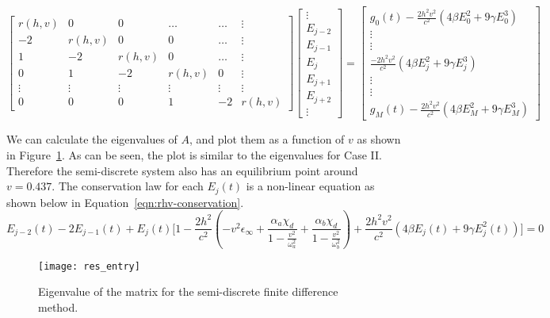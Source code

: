 \documentclass{article}[12pt]
\theoremstyle{plain}
\begin{document}
\[
\begin{bmatrix}
r(h,v) & 0 & 0 & \ldots & \ldots & \vdots \\
-2 & r(h,v) & 0 & 0 & \ldots & \vdots \\
1 & -2 & r(h,v) & 0 & \ldots & \vdots \\
0 & 1 & -2 & r(h,v) & 0 & \vdots \\
\vdots & \vdots & \vdots & \vdots & \vdots & \vdots \\
0 & 0 & 0 & 1 & -2 & r(h,v) 
\end{bmatrix}
\begin{bmatrix}
\vdots \\
E_{j-2} \\
E_{j-1} \\
E_j \\
E_{j+1} \\
E_{j+2} \\
\vdots
\end{bmatrix} = 
\begin{bmatrix}
g_0(t)-\frac{2h^2 v^2}{c^2}( 4\beta E_0^2 + 9\gamma E_0^3) \\
\vdots\\
\vdots\\
\frac{-2h^2 v^2}{c^2}( 4\beta E_j^2 + 9\gamma E_j^3) \\
\vdots\\
\vdots\\
g_M(t)-\frac{2h^2 v^2}{c^2}( 4\beta E_M^2 + 9\gamma E_M^3)
\end{bmatrix}
\]

We can calculate the eigenvalues of $A$, and plot them as a function of $v$ as shown in Figure~\ref{fig:semi-discrete-eigen}.
As can be seen, the plot is similar to the eigenvalues for Case II. Therefore the semi-discrete system also has an equilibrium point
around $v=0.437$. The conservation law for each $E_j(t)$ is a non-linear equation as shown below in Equation~\ref{eqn:rhv-conservation}.
\begin{equation}
E_{j-2}(t) - 2E_{j-1}(t) + E_j(t)\Big[1-\frac{2h^2}{c^2}(-v^2\epsilon_\infty + \frac{\alpha_a \chi_d }{1-\frac{v^2}{\omega_a^2}} + \frac{\alpha_b \chi_d }{1-\frac{v^2}{\omega_b^2}}) 
+ \frac{2h^2 v^2}{c^2}( 4\beta E_j(t) + 9\gamma E_j^2(t))\Big] = 0 \label{eqn:rhv-conservation}
\end{equation}

\begin{figure}
\begin{center}
\texttt{[image: res\_entry]}
\caption{Eigenvalue of the matrix for the semi-discrete finite difference method.}
\label{fig:semi-discrete-eigen}
\end{center}
\end{figure}
\end{document}
